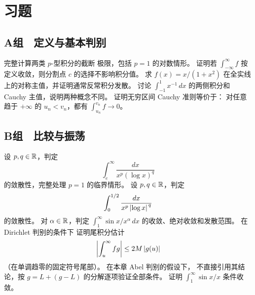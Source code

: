 \section*{习题}

\subsection*{A组　定义与基本判别}
\begin{enumerate}[label=\textbf{\thechapter.\arabic*.}]
  完整计算两类 \(p\)-型积分的截断
 极限，包括 \(p=1\) 的对数情形。
  证明若
 \(\int_{-\infty}^\infty f\) 按定义收敛，则分割点 \(c\) 的选择不影响积分值。
  求
 \(f(x)=x/(1+x^2)\) 在全实线上的对称主值，并证明通常反常积分发散。
  讨论
 \(\int_{-1}^1x^{-1}\,dx\) 的两侧积分和 Cauchy 主值，说明两种概念不同。
  证明无穷区间 Cauchy 准则等价于：
 对任意趋于 \(+\infty\) 的 \(u_n<v_n\)，都有
 \(\int_{u_n}^{v_n}f\to0\)。
\end{enumerate}

\subsection*{B组　比较与振荡}
\begin{enumerate}[label=\textbf{\thechapter.\arabic*.},resume]
  设 \(p,q\in\mathbb{R}\)，判定
 \[
  \int_e^\infty\frac{dx}{x^p(\log x)^q}
 \]
 的敛散性，完整处理 \(p=1\) 的临界情形。
  设 \(p,q\in\mathbb{R}\)，判定
 \[
  \int_0^{1/2}\frac{dx}{x^p\left|\log x\right|^{\,q}}
 \]
 的敛散性。
  对 \(\alpha\in\mathbb{R}\)，判定
 \(\int_1^\infty \sin x/x^\alpha\,dx\) 的收敛、绝对收敛和发散范围。
  在 Dirichlet 判别的条件下
 证明尾积分估计
 \[
  \left|\int_u^\infty fg\right|\le 2M\left|g(u)\right|
 \]
 （在单调趋零的固定符号尾部）。
  在本章 Abel 判别的假设下，
 不直接引用其结论，按
 \(g=L+(g-L)\) 的分解逐项验证全部条件。
  证明
 \(\int_1^\infty\sin x/x\) 条件收敛。
\end{enumerate}

